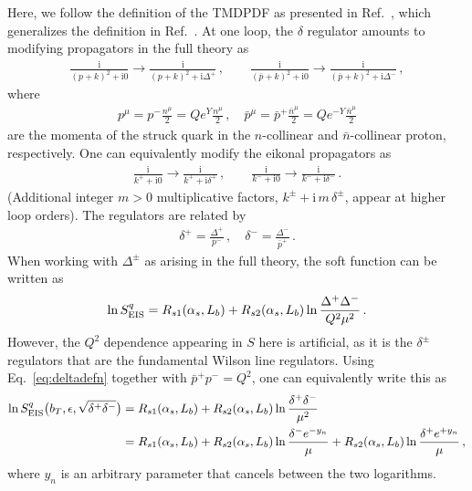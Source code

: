 \documentclass[11pt,a4paper]{article}
\DeclareRobustCommand{\eq}[1]{Eq.~\eqref{eq:#1}}
\DeclareRobustCommand{\mycite}[1]{Ref.~\cite{#1}}
\newcommand{\img}{\mathrm{i}}
\newcommand{\eps}{\epsilon}
\newcommand{\nn}{\nonumber}
\newcommand{\bn}{{\bar{n}}}
\newcommand{\as}{\alpha_s}
\begin{document}
Here, we follow the definition of the TMDPDF as presented in \mycite{Echevarria:2012js},
which generalizes the definition in \mycite{GarciaEchevarria:2011rb}.
At one loop, the $\delta$ regulator amounts to modifying propagators in the full theory as
\begin{align}
 \frac{\img}{(p+k)^2+\img0} \to \frac{\img}{(p+k)^2+\img \Delta^+}
\,,\qquad
 \frac{\img}{(\bar p+k)^2+\img0} \to \frac{\img}{(\bar p+k)^2+\img \Delta^-}
\,,\end{align}
where
\begin{align}
 p^\mu = p^- \frac{n^\mu}{2} = Q e^Y \frac{n^\mu}{2}
\,,\quad
 \bar p^\mu = \bar p^+ \frac{\bar n^\mu}{2} = Q e^{-Y} \frac{\bar n^\mu}{2}
\end{align}
are the momenta of the struck quark in the $n$-collinear and $\bn$-collinear proton, respectively.
One can equivalently modify the eikonal propagators as
\begin{align}
 \frac{\img}{k^++\img0} \to \frac{\img}{k^++\img \delta^+}
\,,\qquad
 \frac{\img}{k^-+\img0} \to \frac{\img}{k^-+\img \delta^-}
\,.\end{align}
(Additional integer $m>0$ multiplicative factors, $k^\pm + \img\,m\,\delta^\pm$, appear at higher loop orders).
The regulators are related by
\begin{align}  \label{eq:deltadefn}
 \delta^+  = \frac{\Delta^+}{p^-} \,,\quad \delta^- = \frac{\Delta^-}{\bar p^+}
\,.\end{align}
When working with $\Delta^\pm$ as arising in the full theory, the soft function can be written as \cite{Echevarria:2012js}
\begin{align}
 \ln S^q_{\rm EIS} = R_{s1}(\as, L_b) + R_{s2}(\as, L_b) \ln\frac{\Delta^+ \Delta^-}{Q^2 \mu^2}
\,.\end{align}
However, the $Q^2$ dependence appearing in $S$ here is artificial, as it is the $\delta^\pm$ regulators that are the fundamental Wilson line regulators.
Using \eq{deltadefn} together with $\bar p^+ p^- = Q^2$, one can equivalently write this as
\begin{align} \label{eq:S_delta_tmp}
 \ln S^q_{\rm EIS}\bigl(b_T, \eps, \sqrt{\delta^+ \delta^-}\bigr) &
 = R_{s1}(\as, L_b) + R_{s2}(\as, L_b) \ln\frac{\delta^+ \delta^-}{\mu^2}
\\*\nn&
 = R_{s1}(\as, L_b) + R_{s2}(\as, L_b) \ln\frac{\delta^- e^{-y_n}}{\mu}
                    + R_{s2}(\as, L_b) \ln\frac{\delta^+ e^{+y_n}}{\mu}
\,,\end{align}
where $y_n$ is an arbitrary parameter that cancels between the two logarithms.
\end{document}
